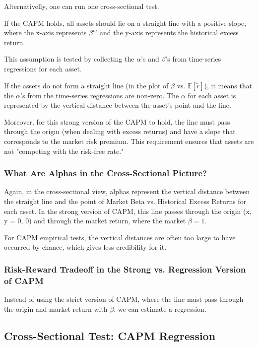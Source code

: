 \documentclass{article}
\begin{document}
Alternativelly, one can run one cross-sectional test.

If the CAPM holds, all assets should lie on a straight line with a positive slope, where the x-axis represents $\beta^{m}$ and the y-axis represents the historical excess return.

This assumption is tested by collecting the $\alpha$'s and $\beta$'s from time-series regressions for each asset.

If the assets do not form a straight line (in the plot of $\beta$ vs. $\mathbb{E}[\tilde{r}]$), it means that the $\alpha$'s from the time-series regressions are non-zero. The $\alpha$ for each asset is represented by the vertical distance between the asset's point and the line.

Moreover, for this strong version of the CAPM to hold, the line must pass through the origin (when dealing with excess returns) and have a slope that corresponds to the market risk premium. This requirement ensures that assets are not "competing with the risk-free rate."

\subsubsection{What Are Alphas in the Cross-Sectional Picture?}

Again, in the cross-sectional view, alphas represent the vertical distance between the straight line and the point of Market Beta vs. Historical Excess Returns for each asset. In the strong version of CAPM, this line passes through the origin (x, y = 0, 0) and through the market return, where the market $\beta = 1$.

For CAPM empirical tests, the vertical distances are often too large to have occurred by chance, which gives less credibility for it.

\subsubsection{Risk-Reward Tradeoff in the Strong vs. Regression Version of CAPM}

Instead of using the strict version of CAPM, where the line must pass through the origin and market return with $\beta$, we can estimate a regression.

\subsection{Cross-Sectional Test: CAPM Regression}
\end{document}
